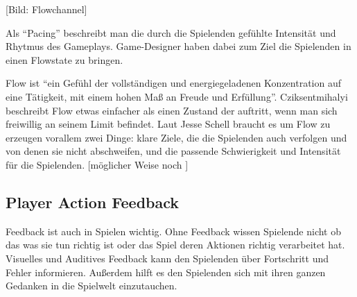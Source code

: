 [Bild: Flowchannel]

Als "`Pacing"' beschreibt man die durch die Spielenden gefühlte Intensität und Rhytmus des Gameplays\cite{_the_level_design_book}. Game-Designer haben dabei zum Ziel die Spielenden in einen Flowstate zu bringen.

Flow ist "`ein Gefühl der vollständigen und energiegeladenen Konzentration auf eine Tätigkeit, mit einem hohen Maß an Freude und Erfüllung"'\cite[S.204]{_art_of_gamedesign}.
Cziksentmihalyi beschreibt Flow etwas einfacher als einen Zustand der auftritt, wenn man sich freiwillig an seinem Limit befindet\cite{_flow}.
Laut Jesse Schell braucht es um Flow zu erzeugen vorallem zwei Dinge: klare Ziele, die die Spielenden auch verfolgen und von denen sie nicht abschweifen, und die passende Schwierigkeit und Intensität für die Spielenden\cite{_art_of_gamedesign}.
[möglicher Weise noch \cite{_theory_of_fun}]

\subsection{Player Action Feedback}

Feedback ist auch in Spielen wichtig. Ohne Feedback wissen Spielende nicht ob das was sie tun richtig ist oder das Spiel deren Aktionen richtig verarbeitet hat. Visuelles und Auditives Feedback kann den Spielenden über Fortschritt und Fehler informieren. Außerdem hilft es den Spielenden sich mit ihren ganzen Gedanken in die Spielwelt einzutauchen.